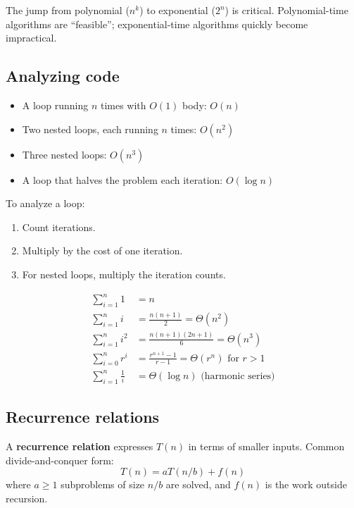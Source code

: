 The jump from polynomial ($n^k$) to exponential ($2^n$) is critical. Polynomial-time algorithms are ``feasible''; exponential-time algorithms quickly become impractical.

\subsection*{Analyzing code}

\begin{theorem}
\begin{itemize}
  \item A loop running $n$ times with $O(1)$ body: $O(n)$
  \item Two nested loops, each running $n$ times: $O(n^2)$
  \item Three nested loops: $O(n^3)$
  \item A loop that halves the problem each iteration: $O(\log n)$
\end{itemize}
\end{theorem}

\begin{strategy}
To analyze a loop:
\begin{enumerate}
  \item Count iterations.
  \item Multiply by the cost of one iteration.
  \item For nested loops, multiply the iteration counts.
\end{enumerate}
\end{strategy}

\begin{theorem}
\begin{align*}
\sum_{i=1}^n 1 &= n \\
\sum_{i=1}^n i &= \frac{n(n+1)}{2} = \Theta(n^2) \\
\sum_{i=1}^n i^2 &= \frac{n(n+1)(2n+1)}{6} = \Theta(n^3) \\
\sum_{i=0}^n r^i &= \frac{r^{n+1} - 1}{r - 1} = \Theta(r^n) \text{ for } r > 1 \\
\sum_{i=1}^n \frac{1}{i} &= \Theta(\log n) \text{ (harmonic series)}
\end{align*}
\end{theorem}

\subsection*{Recurrence relations}

\begin{definition}
A \textbf{recurrence relation} expresses $T(n)$ in terms of smaller inputs. Common divide-and-conquer form:
\[
T(n) = aT(n/b) + f(n)
\]
where $a \geq 1$ subproblems of size $n/b$ are solved, and $f(n)$ is the work outside recursion.
\end{definition}

